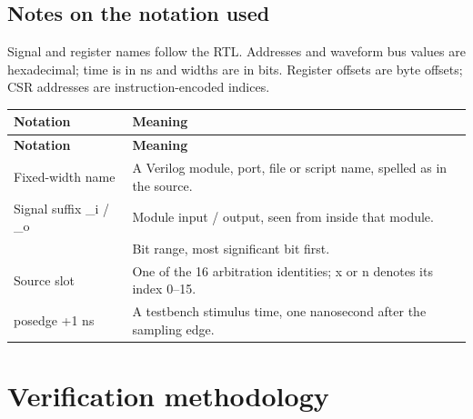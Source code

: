 \documentclass[11pt]{article}
\begin{document}
\subsection{Notes on the notation used}
\noindent Signal and register names follow the RTL. Addresses and waveform bus values are hexadecimal; time is in ns and widths are in bits. Register offsets are byte offsets; CSR addresses are instruction-encoded indices.\par\medskip
{\small
\begin{longtable}{@{}L{0.2600\dimexpr\linewidth-12pt\relax}L{0.7400\dimexpr\linewidth-12pt\relax}@{}}
\toprule
\textbf{Notation} & \textbf{Meaning} \\ \midrule
\endfirsthead
\toprule
\textbf{Notation} & \textbf{Meaning} \\ \midrule
\endhead
Fixed-width name & A Verilog module, port, file or script name, spelled as in the source. \\ \addlinespace[3pt]
Signal suffix \_i / \_o & Module input / output, seen from inside that module. \\ \addlinespace[3pt]
[a:b] & Bit range, most significant bit first. \\ \addlinespace[3pt]
Source slot & One of the 16 arbitration identities; x or n denotes its index 0–15. \\ \addlinespace[3pt]
posedge +1 ns & A testbench stimulus time, one nanosecond after the sampling edge. \\*
\bottomrule\end{longtable}}

\clearpage
\section{Verification methodology}
\end{document}
